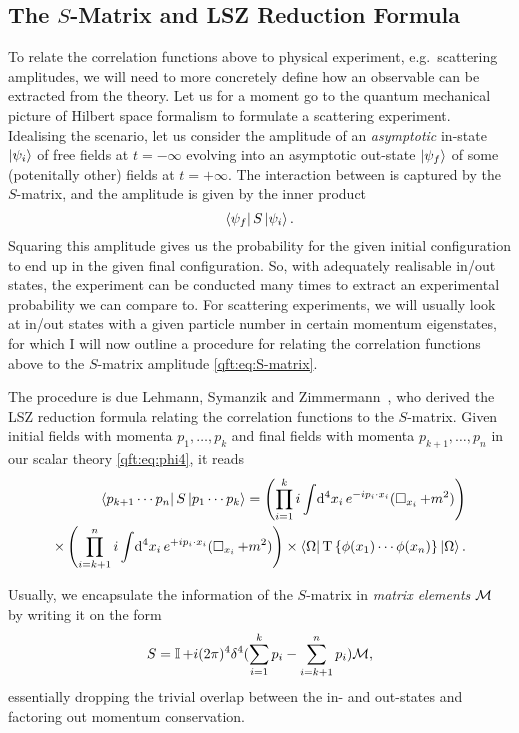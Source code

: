 \documentclass[../main.tex]{subfiles}
\begin{document}
\subsection{The \(S\)-Matrix and LSZ Reduction Formula}
To relate the correlation functions above to physical experiment, e.g.\ scattering amplitudes, we will need to more concretely define how an observable can be extracted from the theory.
Let us for a moment go to the quantum mechanical picture of Hilbert space formalism to formulate a scattering experiment.
Idealising the scenario, let us consider the amplitude of an \emph{asymptotic} in-state \(\left| \psi_i \right\rangle\) of free fields at \(t=-\infty\) evolving into an asymptotic out-state \(\left| \psi_f \right\rangle\) of some (potenitally other) fields at \(t=+\infty\).
The interaction between is captured by the \(S\)-matrix, and the amplitude is given by the inner product
\begin{equation}
  \label{qft:eq:S-matrix}
  \left\langle \psi_f \right| S \left| \psi_i \right\rangle.
\end{equation}
Squaring this amplitude gives us the probability for the given initial configuration to end up in the given final configuration.
So, with adequately realisable in/out states, the experiment can be conducted many times to extract an experimental probability we can compare to.
For scattering experiments, we will usually look at in/out states with a given particle number in certain momentum eigenstates, for which I will now outline a procedure for relating the correlation functions above to the \(S\)-matrix amplitude \cref{qft:eq:S-matrix}.

The procedure is due Lehmann, Symanzik and Zimmermann~\cite{LSZ}, who derived the LSZ reduction formula relating the correlation functions to the \(S\)-matrix.
Given initial fields with momenta \(p_1, \ldots, p_k\) and final fields with momenta \(p_{k+1}, \ldots, p_n\) in our scalar theory \cref{qft:eq:phi4}, it reads~\cite{Schwartz:2014sze}
\begin{align}
  \label{qft:eq:LSZ_S-matrix}
  \nonumber
  \left\langle p_{k+1}\cdots p_n \right| S \left| p_1 \cdots p_k \right\rangle = \left(\prod_{i=1}^k i \int \!\mathrm{d}^4x_i\, e^{-ip_i \cdot x_i} (\operatorname{\Box}_{x_i} + m^2)\right) \\
  \times \left(\prod_{i=k+1}^n i \int \!\mathrm{d}^4x_i\, e^{+ip_i \cdot x_i} (\operatorname{\Box}_{x_i} + m^2)\right)
  \times \left\langle \Omega \right| \operatorname{T}\left\{\phi(x_1)\cdots \phi(x_n)\right\} \left| \Omega \right\rangle.
\end{align}

Usually, we encapsulate the information of the \(S\)-matrix in \emph{matrix elements} \(\mathcal{M}\) by writing it on the form
\begin{equation}
  \label{qft:eq:S-matrix_expansion}
  S = \operatorname{\mathbb{I}} + i(2\pi)^4 \delta^4(\sum_{i=1}^k p_i - \sum_{i=k+1}^n p_i) \mathcal{M},
\end{equation}
essentially dropping the trivial overlap between the in- and out-states and factoring out momentum conservation.
\medskip
\end{document}
